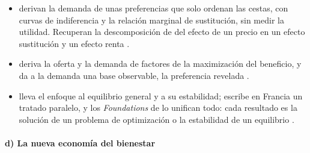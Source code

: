 \documentclass[11pt]{article}
\begin{document}
\begin{itemize}
\item \textcite{HicksAllen1934Reconsideration} derivan la demanda de unas preferencias que solo ordenan las cestas, con curvas de indiferencia y la relación marginal de sustitución, sin medir la utilidad. Recuperan la descomposición de  \parencite*{Slutsky1915Teoria} del efecto de un precio en un efecto sustitución y un efecto renta .
\item {} \parencite*{Hotelling1932Edgeworth} deriva la oferta y la demanda de factores de la maximización del beneficio, y  \parencite*{Samuelson1938Note} da a la demanda una base observable, la preferencia revelada .
\item \textcite{Hicks1939Value} lleva el enfoque al equilibrio general y a su estabilidad; \textcite{Allais1943Recherche} escribe en Francia un tratado paralelo, y los \emph{Foundations} de \textcite{Samuelson1947Foundations} lo unifican todo: cada resultado es la solución de un problema de optimización o la estabilidad de un equilibrio .
\end{itemize}

\paragraph{d) La nueva economía del bienestar}
\end{document}
